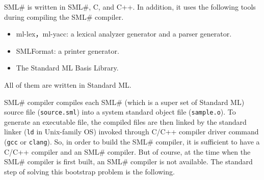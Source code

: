 \documentclass{jbook}
\newcommand{\smlsharp}{SML\#}
\begin{document}
	\smlsharp{} is written in \smlsharp{}, C, and C++.
	In addition, it uses the following tools during compiling the
\smlsharp{} compiler.
\begin{itemize}
\item ml-lex，ml-yacc: a lexical analyzer generator and a parser generator.
\item SMLFormat: a printer generator.
\item The Standard ML Basis Library.
\end{itemize}
	All of them are written in Standard ML.

	\smlsharp{} compiler compiles each \smlsharp{} (which is a super
set of Standard ML) source file ({\tt source.sml}) into a system standard
object file ({\tt sample.o}).
	To generate an executable file, the compiled files are then linked
by the standard linker ({\tt ld} in Unix-family OS) invoked through
C/C++ compiler driver command ({\tt gcc} or {\tt clang}).
	So, in order to build the \smlsharp{} compiler, it is sufficient
to have a C/C++ compiler and an \smlsharp{} compiler.
	But of course, at the time when the \smlsharp{} compiler is
first built, an \smlsharp{} compiler is not available.
	The standard step of solving this bootstrap problem is the
following.
\end{document}
